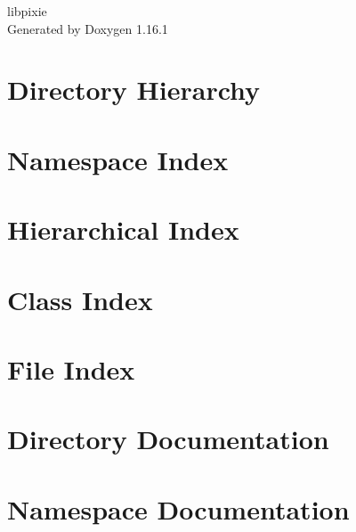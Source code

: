 \documentclass[twoside]{book}
\newcommand{\+}{\discretionary{\mbox{\scriptsize$\hookleftarrow$}}{}{}}
\newcommand{\clearemptydoublepage}{%
    \newpage{\pagestyle{empty}\cleardoublepage}%
  }
\begin{document}
  \raggedbottom
    \hypersetup{pageanchor=false,
                bookmarksnumbered=true,
                pdfencoding=unicode
               }
  \begin{titlepage}
  \vspace*{7cm}
  \begin{center}%
  {\Large libpixie}\\
  \vspace*{1cm}
  {\large Generated by Doxygen 1.16.1}\\
  \end{center}
  \end{titlepage}
  \clearemptydoublepage
  \tableofcontents
  \clearemptydoublepage
  \hypersetup{pageanchor=true}

\chapter{Directory Hierarchy}

\chapter{Namespace Index}

\chapter{Hierarchical Index}

\chapter{Class Index}

\chapter{File Index}

\chapter{Directory Documentation}

\chapter{Namespace Documentation}


\end{document}
